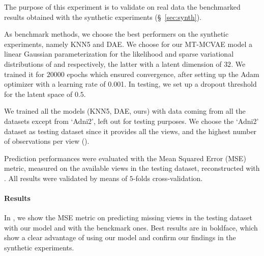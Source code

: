 The purpose of this experiment is to validate on real data the benchmarked results obtained with the synthetic experiments (\S~\ref{sec:synth}).

As benchmark methods, we choose the best performers on the synthetic experiments, namely KNN5 and DAE.
We choose for our MT-MCVAE model a linear Gaussian parameterization for the likelihood and sparse variational distributions of  and  respectively,
the latter with a latent dimension of $32$.
We trained it for $20000$ epochs which ensured convergence, after setting up the Adam optimizer with a learning rate of 0.001.
In testing, we set up a dropout threshold for the latent space of $0.5$.

We trained all the models (KNN5, DAE, ours) with data coming from all the datasets except from `Adni2', left out for testing purposes.
We choose the `Adni2' dataset as testing dataset since it provides all the views, and the highest number of observations per view ().

Prediction performances were evaluated with the Mean Squared Error (MSE) metric, measured on the available views in the testing dataset, reconstructed with .
All results were validated by means of $5$-folds cross-validation.

\paragraph{Results}
In , we show the MSE metric on predicting missing views in the testing dataset with our model and with the benckmark ones.
Best results are in boldface, which show a clear advantage of using our model and confirm our findings in the synthetic experiments.

